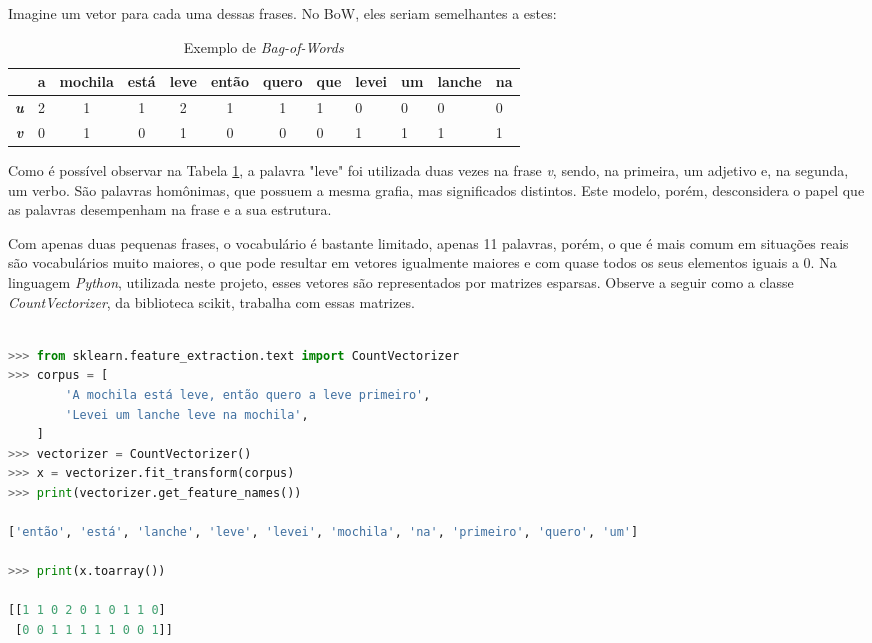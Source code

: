 Imagine um vetor para cada uma dessas frases. No BoW, eles seriam semelhantes a estes:

\begin{center}
\begin{table}[htbp]
\centering
\begin{tabular}{ccccccclllll}
\hline
 & \textbf{a} & \textbf{mochila} & \textbf{está} & \textbf{leve} & \textbf{então} & \textbf{quero} & \textbf{que} & \textbf{levei} & \textbf{um} & \textbf{lanche} & \textbf{na} \\ \hline
\textbf{\textit{u}} & 2 & 1 & 1 & 2 & 1 & 1 & 1 & 0 & 0 & 0 & 0 \\
\textbf{\textit{v}} & 0 & 1 & 0 & 1 & 0 & 0 & 0 & 1 & 1 & 1 & 1
\end{tabular}
\caption{Exemplo de \textit{Bag-of-Words}}
\label{bow}
\end{table}
\end{center}

Como é possível observar na Tabela \ref{bow}, a palavra "leve" foi utilizada duas vezes na frase \textit{v}, sendo, na primeira, um adjetivo e, na segunda, um verbo. São palavras homônimas, que possuem a mesma grafia, mas significados distintos. Este modelo, porém, desconsidera o papel que as palavras desempenham na frase e a sua estrutura.

Com apenas duas pequenas frases, o vocabulário é bastante limitado, apenas 11 palavras, porém, o que é mais comum em situações reais são vocabulários muito maiores, o que pode resultar em vetores igualmente maiores e com quase todos os seus elementos iguais a 0. Na linguagem \textit{Python}, utilizada neste projeto, esses vetores são representados por matrizes esparsas. Observe a seguir como a classe \textit{CountVectorizer}, da biblioteca scikit, trabalha com essas matrizes.

\begin{lstlisting}[language=python, caption=Matriz esparsa da classe csr\_matrix, label={lst:csr_matrix}]

>>> from sklearn.feature_extraction.text import CountVectorizer
>>> corpus = [
        'A mochila está leve, então quero a leve primeiro',
        'Levei um lanche leve na mochila',
    ]
>>> vectorizer = CountVectorizer()
>>> x = vectorizer.fit_transform(corpus)
>>> print(vectorizer.get_feature_names())

['então', 'está', 'lanche', 'leve', 'levei', 'mochila', 'na', 'primeiro', 'quero', 'um']

>>> print(x.toarray())

[[1 1 0 2 0 1 0 1 1 0]
 [0 0 1 1 1 1 1 0 0 1]]
 
\end{lstlisting}

